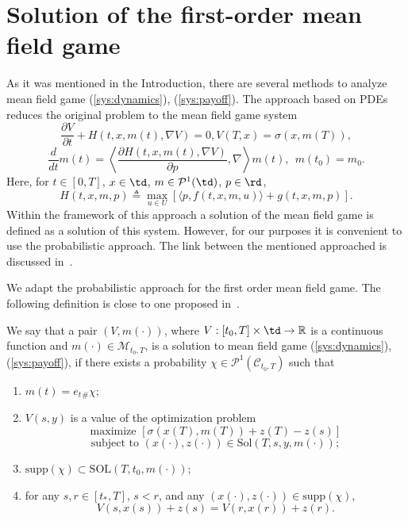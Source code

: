 \documentclass[a4paper,12pt]{article}
\begin{document}
\section{Solution of the first-order mean field game}\label{sect:solution_def}
As it was mentioned in the Introduction, there are several methods to analyze  mean field game (\ref{sys:dynamics}), (\ref{sys:payoff}). The approach based on PDEs reduces the original problem to the mean field game system
$$\frac{\partial V}{\partial t}+H(t,x,m(t),\nabla V)=0, V(T,x)=\sigma(x,m(T)),  $$
$$\frac{d}{dt}m(t)=\left\langle\frac{\partial H(t,x,m(t),\nabla V)}{\partial p},\nabla\right\rangle m(t),\ \ m(t_0)=m_0. $$ Here, for $t\in [0,T]$, $x\in \td$, $m\in\mathcal{P}^1(\td)$, $p\in\rd$, $$H(t,x,m,p)\triangleq \max_{u\in U}[\langle p,f(t,x,m,u)\rangle+g(t,x,m,p)]. $$ Within the framework of this approach a solution of the mean field game is defined as a solution of this system. However, for our purposes it is convenient to use the probabilistic approach.  The link between the mentioned approached is discussed in~\cite{Lacker_2015}.

We adapt the probabilistic approach for the first order mean field game. The following definition is close to one proposed in~\cite{Averboukh_2015}.

\begin{definition}\label{def:solution}
	We say that a pair $(V,m(\cdot))$, where $V:[t_0,T]\times\td\rightarrow \mathbb{R}$ is a continuous function and $m(\cdot)\in\mathcal{M}_{t_0,T}$, is a solution to  mean field game (\ref{sys:dynamics}), (\ref{sys:payoff}), if there exists a probability $\chi\in \mathcal{P}^1(\mathcal{C}_{t_0,T})$ such that
	\begin{enumerate}
		\item $m(t)=e_t{}_\#\chi$;
		\item $V(s,y)$ is a value of the optimization problem
		\begin{equation*}\label{represet_player:problem}
		\text{maximize }\left[\sigma(x(T),m(T))+z(T)-z(s) \right]
		\end{equation*}
		\begin{equation*}\label{represet_player:dynamics}
		\text{subject to }(x(\cdot),z(\cdot))\in\mathrm{Sol}(T,s,y,m(\cdot)); 
		\end{equation*}
		\item $\mathrm{supp}(\chi)\subset \mathrm{SOL}(T,t_0,m(\cdot))$;
		\item for any $s,r\in [t_*,T]$, $s<r$, and any $(x(\cdot),z(\cdot))\in \mathrm{supp}(\chi)$,
		$$V(s,x(s))+z(s)=V(r,x(r))+z(r). $$
	\end{enumerate}
\end{definition}
\end{document}
